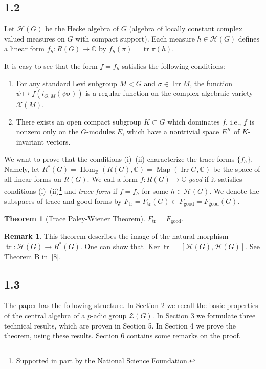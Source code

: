 \documentclass[12pt,a4paper]{article}
\theoremstyle{plain}
\newtheorem{theorem}{Theorem}
\theoremstyle{definition}
\newtheorem{remark}{Remark}
\theoremstyle{remark}
\DeclareMathOperator{\Irr}{Irr}
\DeclareMathOperator{\tr}{tr}
\DeclareMathOperator{\Hom}{Hom}
\DeclareMathOperator{\Ker}{Ker}
\DeclareMathOperator{\Map}{Map}
\newcommand{\cH}{\mathscr{H}}
\newcommand{\cZ}{\mathcal{Z}}
\newcommand{\cX}{\mathcal{X}}
\newcommand{\bC}{\mathbb{C}}
\newcommand{\bZ}{\mathbb{Z}}
\begin{document}
\subsection*{1.2}

Let $\cH(G)$ be the Hecke algebra of $G$ (algebra of locally constant complex valued measures on $G$ with compact support). Each measure $h \in \cH(G)$ defines a linear form $f_h: R(G) \to \bC$ by $f_h(\pi) = \tr \pi(h)$.

It is easy to see that the form $f = f_h$ satisfies the following conditions:
\begin{enumerate}[label=(\roman*)]
\item For any standard Levi subgroup $M < G$ and $\sigma \in \Irr M$, the function $\psi \mapsto f(i_{G,M}(\psi\sigma))$ is a regular function on the complex algebraic variety $\cX(M)$.
\item There exists an open compact subgroup $K \subset G$ which dominates $f$, i.e., $f$ is nonzero only on the $G$-modules $E$, which have a nontrivial space $E^K$ of $K$-invariant vectors.
\end{enumerate}

We want to prove that the conditions (i)--(ii) characterize the trace forms $\{f_h\}$. Namely, let $R^*(G) = \Hom_{\bZ}(R(G), \bC) = \Map(\Irr G, \bC)$ be the space of all linear forms on $R(G)$. We call a form $f: R(G) \to \bC$ \emph{good} if it satisfies conditions (i)--(ii)\footnote{Supported in part by the National Science Foundation.} and \emph{trace form} if $f = f_h$ for some $h \in \cH(G)$. We denote the subspaces of trace and good forms by $F_{\tr} = F_{\tr}(G) \subset F_{\text{good}} = F_{\text{good}}(G)$.

\begin{theorem}[Trace Paley-Wiener Theorem]
$F_{\tr} = F_{\text{good}}$.
\end{theorem}

\begin{remark}
This theorem describes the image of the natural morphism $\tr: \cH(G) \to R^*(G)$. One can show that $\Ker \tr = [\cH(G), \cH(G)]$. See Theorem B in~[8].
\end{remark}

\subsection*{1.3}

The paper has the following structure. In Section 2 we recall the basic properties of the central algebra of a $p$-adic group $\cZ(G)$. In Section 3 we formulate three technical results, which are proven in Section 5. In Section 4 we prove the theorem, using these results. Section 6 contains some remarks on the proof.
\end{document}
